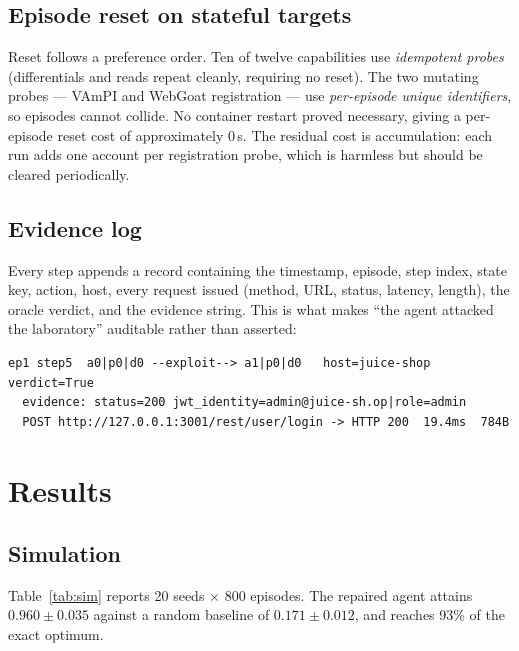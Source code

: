 \documentclass[11pt,a4paper]{report}
\begin{document}
\section{Episode reset on stateful targets}
Reset follows a preference order. Ten of twelve capabilities use
\emph{idempotent probes} (differentials and reads repeat cleanly, requiring no
reset). The two mutating probes --- VAmPI and WebGoat registration --- use
\emph{per-episode unique identifiers}, so episodes cannot collide. No container
restart proved necessary, giving a per-episode reset cost of approximately
$0$\,s. The residual cost is accumulation: each run adds one account per
registration probe, which is harmless but should be cleared periodically.

\section{Evidence log}
Every step appends a record containing the timestamp, episode, step index, state
key, action, host, every request issued (method, URL, status, latency, length),
the oracle verdict, and the evidence string. This is what makes ``the agent
attacked the laboratory'' auditable rather than asserted:

\begin{lstlisting}[caption={An evidence record (abridged).}]
ep1 step5  a0|p0|d0 --exploit--> a1|p0|d0   host=juice-shop  verdict=True
  evidence: status=200 jwt_identity=admin@juice-sh.op|role=admin
  POST http://127.0.0.1:3001/rest/user/login -> HTTP 200  19.4ms  784B
\end{lstlisting}

\chapter{Results}
\label{ch:results}

\section{Simulation}
Table~\ref{tab:sim} reports 20 seeds $\times$ 800 episodes. The repaired agent
attains $0.960 \pm 0.035$ against a random baseline of $0.171 \pm 0.012$, and
reaches 93\% of the exact optimum.
\end{document}
